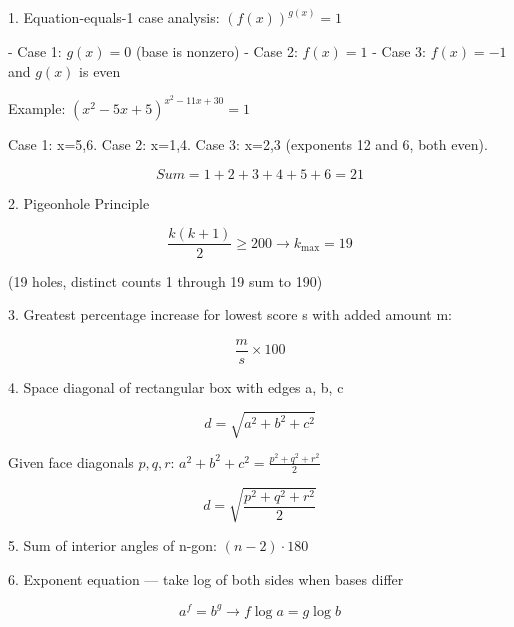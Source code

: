 1. Equation-equals-1 case analysis: $(f(x))^{g(x)} = 1$

- Case 1: $g(x) = 0$ (base is nonzero)
- Case 2: $f(x) = 1$
- Case 3: $f(x) = -1$ and $g(x)$ is even

Example: $(x^2-5x+5)^{x^2-11x+30} = 1$

Case 1: x=5,6. Case 2: x=1,4. Case 3: x=2,3 (exponents 12 and 6, both even).

$$ Sum = 1+2+3+4+5+6 = 21 $$

2. Pigeonhole Principle

$$ \frac{k(k+1)}{2} \ge 200 \rightarrow k_{\max}=19 $$

(19 holes, distinct counts 1 through 19 sum to 190)

3. Greatest percentage increase for lowest score s with added amount m:

$$ \frac{m}{s} \times 100 $$

4. Space diagonal of rectangular box with edges a, b, c

$$ d = \sqrt{a^2+b^2+c^2} $$

Given face diagonals $p, q, r$: $a^2+b^2+c^2 = \frac{p^2+q^2+r^2}{2}$

$$ d = \sqrt{\frac{p^2+q^2+r^2}{2}} $$

5. Sum of interior angles of n-gon: $(n-2) \cdot 180$

6. Exponent equation — take log of both sides when bases differ

$$ a^f = b^g \rightarrow f \log a = g \log b $$
